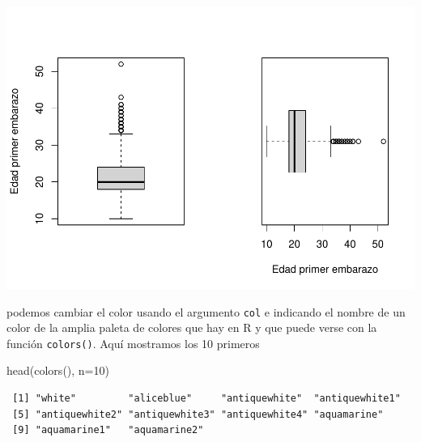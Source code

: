 \documentclass[
]{book}
\newenvironment{Shaded}{\begin{snugshade}}{\end{snugshade}}
\newcommand{\AttributeTok}[1]{\textcolor[rgb]{0.77,0.63,0.00}{#1}}
\newcommand{\ConstantTok}[1]{\textcolor[rgb]{0.00,0.00,0.00}{#1}}
\newcommand{\DecValTok}[1]{\textcolor[rgb]{0.00,0.00,0.81}{#1}}
\newcommand{\FunctionTok}[1]{\textcolor[rgb]{0.00,0.00,0.00}{#1}}
\newcommand{\NormalTok}[1]{#1}
\newcommand{\SpecialCharTok}[1]{\textcolor[rgb]{0.00,0.00,0.00}{#1}}
\newcommand{\StringTok}[1]{\textcolor[rgb]{0.31,0.60,0.02}{#1}}
\begin{document}
\includegraphics{fig/unnamed-chunk-76-1.pdf}

podemos cambiar el color usando el argumento \texttt{col} e indicando el nombre de un color de la amplia paleta de colores que hay en R y que puede verse con la función \texttt{colors()}. Aquí mostramos los 10 primeros

\begin{Shaded}
\begin{Highlighting}[]
\FunctionTok{head}\NormalTok{(}\FunctionTok{colors}\NormalTok{(), }\AttributeTok{n=}\DecValTok{10}\NormalTok{)}
\end{Highlighting}
\end{Shaded}

\begin{verbatim}
 [1] "white"         "aliceblue"     "antiquewhite"  "antiquewhite1"
 [5] "antiquewhite2" "antiquewhite3" "antiquewhite4" "aquamarine"   
 [9] "aquamarine1"   "aquamarine2"  
\end{verbatim}

\begin{Shaded}
\end{Shaded}
\end{document}
